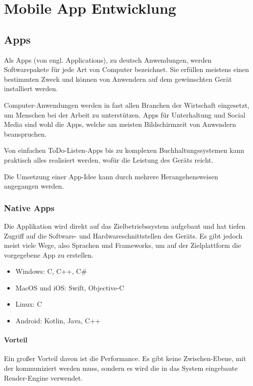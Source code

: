 \chapter{Mobile App Entwicklung}
\label{mobiledev}

\section{Apps}
Als Apps (von engl. Applications), zu deutsch Anwendungen, werden Softwarepakete für jede Art von
Computer bezeichnet. Sie erfüllen meistens einen bestimmten Zweck und können von Anwendern auf dem
gewünschten Gerät installiert werden.

Computer-Anwendungen werden in fast allen Branchen der Wirtschaft eingesetzt, um Menschen bei der
Arbeit zu unterstützen. Apps für Unterhaltung und Social Media sind wohl die Apps, welche am meisten
Bildschirmzeit von Anwendern beanspruchen.

Von einfachen ToDo-Listen-Apps bis zu komplexen Buchhaltungssystemen kann praktisch alles realisiert
werden, wofür die Leistung des Geräts reicht.

Die Umsetzung einer App-Idee kann durch mehrere Herangehensweisen angegangen werden.

\subsection{Native Apps}
Die Applikation wird direkt auf das Zielbetriebssystem aufgebaut und hat tiefen Zugriff auf die
Software- und Hardwareschnittstellen des Geräts. Es gibt jedoch meist viele Wege, also Sprachen und
Frameworks, um auf der Zielplattform die vorgegebene App zu erstellen.

\begin{itemize}
  \item Windows: C, C++, C\#
  \item MacOS und iOS: Swift, Objective-C
  \item Linux: C
  \item Android: Kotlin, Java, C++
\end{itemize}

\subsubsection{Vorteil}
Ein großer Vorteil davon ist die Performance. Es gibt keine Zwischen-Ebene, mit der kommuniziert
werden muss, sondern es wird die in das System eingebaute Render-Engine verwendet.

